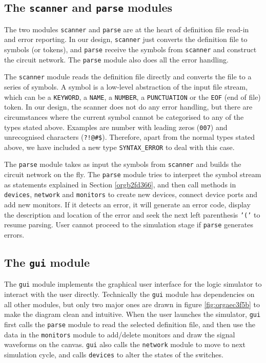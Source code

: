 \documentclass[10pt,a4paper]{article}
\begin{document}
\subsection{The \texttt{scanner} and \texttt{parse} modules}
\label{sec:org69f2c8b}

The two modules \texttt{scanner} and \texttt{parse} are at the heart of definition
file read-in and error reporting. In our design, \texttt{scanner} just
converts the definition file to symbols (or tokens), and \texttt{parse}
receive the symbols from \texttt{scanner} and construct the circuit network.
The \texttt{parse} module also does all the error handling.

The \texttt{scanner} module reads the definition file directly and converts
the file to a series of symbols. A symbol is a low-level abstraction
of the input file stream, which can be a \texttt{KEYWORD}, a \texttt{NAME}, a
\texttt{NUMBER}, a \texttt{PUNCTUATION} or the \texttt{EOF} (end of file) token. In our
design, the scanner does not do any error handling, but there are
circumstances where the current symbol cannot be categorised to any of
the types stated above. Examples are number with leading zeros (\texttt{007})
and unrecognised characters (\texttt{?!@\#\$}). Therefore, apart from the
normal types stated above, we have included a new type \texttt{SYNTAX\_ERROR}
to deal with this case.

The \texttt{parse} module takes as input the symbols from \texttt{scanner} and builds
the circuit network on the fly. The \texttt{parse} module tries to interpret
the symbol stream as statements explained in Section \ref{orgb2fd366},
and then call methods in \texttt{devices}, \texttt{network} and \texttt{monitors} to create
new devices, connect device ports and add new monitors. If it detects
an error, it will generate an error code, display the description and
location of the error and seek the next left parenthesis \texttt{'('} to
resume parsing. User cannot proceed to the simulation stage if \texttt{parse}
generates errors.

\subsection{The \texttt{gui} module}
\label{sec:org7fd0f3f}

The \texttt{gui} module implements the graphical user interface for the logic
simulator to interact with the user directly. Technically the \texttt{gui}
module has dependencies on all other modules, but only two major ones
are drawn in figure \ref{fig:orgaec3f5b} to make the diagram clean and
intuitive. When the user launches the simulator, \texttt{gui} first calls the
\texttt{parse} module to read the selected definition file, and then use the
data in the \texttt{monitors} module to add/delete monitors and draw the
signal waveforms on the canvas. \texttt{gui} also calls the \texttt{network} module
to move to next simulation cycle, and calls \texttt{devices} to alter the
states of the switches.
\end{document}
